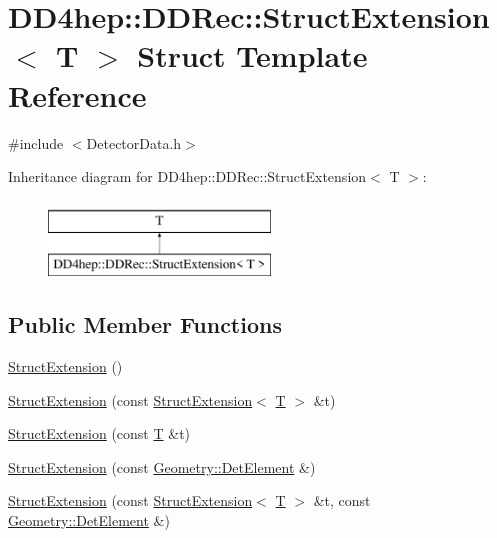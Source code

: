 \hypertarget{struct_d_d4hep_1_1_d_d_rec_1_1_struct_extension}{}\section{D\+D4hep\+:\+:D\+D\+Rec\+:\+:Struct\+Extension$<$ T $>$ Struct Template Reference}
\label{struct_d_d4hep_1_1_d_d_rec_1_1_struct_extension}


{\ttfamily \#include $<$Detector\+Data.\+h$>$}

Inheritance diagram for D\+D4hep\+:\+:D\+D\+Rec\+:\+:Struct\+Extension$<$ T $>$\+:\begin{figure}[H]
\begin{center}
\leavevmode
\includegraphics[height=2.000000cm]{struct_d_d4hep_1_1_d_d_rec_1_1_struct_extension}
\end{center}
\end{figure}
\subsection*{Public Member Functions}
\begin{DoxyCompactItemize}
\item 
\hyperlink{struct_d_d4hep_1_1_d_d_rec_1_1_struct_extension_acd2fbef78c0650cd1a0bd81f525761bb}{Struct\+Extension} ()
\item 
\hyperlink{struct_d_d4hep_1_1_d_d_rec_1_1_struct_extension_ab56b52c2e41637c16f24c14cde46d742}{Struct\+Extension} (const \hyperlink{struct_d_d4hep_1_1_d_d_rec_1_1_struct_extension}{Struct\+Extension}$<$ \hyperlink{class_t}{T} $>$ \&t)
\item 
\hyperlink{struct_d_d4hep_1_1_d_d_rec_1_1_struct_extension_a169c4dd3b2b85f44cf5b8ec626fee52a}{Struct\+Extension} (const \hyperlink{class_t}{T} \&t)
\item 
\hyperlink{struct_d_d4hep_1_1_d_d_rec_1_1_struct_extension_ab950293a41316a0603953bc9357bd777}{Struct\+Extension} (const \hyperlink{class_d_d4hep_1_1_geometry_1_1_det_element}{Geometry\+::\+Det\+Element} \&)
\item 
\hyperlink{struct_d_d4hep_1_1_d_d_rec_1_1_struct_extension_aaf32001dd03ca30024af4a044f8b3169}{Struct\+Extension} (const \hyperlink{struct_d_d4hep_1_1_d_d_rec_1_1_struct_extension}{Struct\+Extension}$<$ \hyperlink{class_t}{T} $>$ \&t, const \hyperlink{class_d_d4hep_1_1_geometry_1_1_det_element}{Geometry\+::\+Det\+Element} \&)
\end{DoxyCompactItemize}


